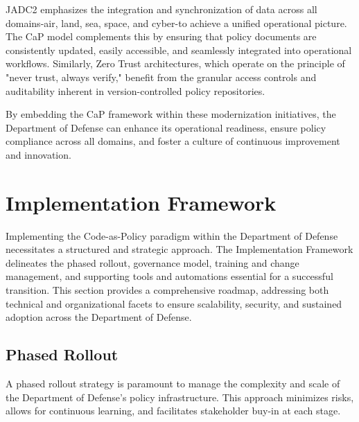 \documentclass[11pt]{article}
\begin{document}
	JADC2 emphasizes the integration and synchronization of data across all domains-air, land, sea, space, and cyber-to achieve a unified operational picture. The CaP model complements this by ensuring that policy documents are consistently updated, easily accessible, and seamlessly integrated into operational workflows. Similarly, Zero Trust architectures, which operate on the principle of "never trust, always verify," benefit from the granular access controls and auditability inherent in version-controlled policy repositories.

	By embedding the CaP framework within these modernization initiatives, the Department of Defense can enhance its operational readiness, ensure policy compliance across all domains, and foster a culture of continuous improvement and innovation.

	\section{Implementation Framework}
\label{sec:implementation-framework}

Implementing the Code-as-Policy paradigm within the Department of Defense necessitates a structured and strategic approach. The Implementation Framework delineates the phased rollout, governance model, training and change management, and supporting tools and automations essential for a successful transition. This section provides a comprehensive roadmap, addressing both technical and organizational facets to ensure scalability, security, and sustained adoption across the Department of Defense.

\subsection{Phased Rollout}

A phased rollout strategy is paramount to manage the complexity and scale of the Department of Defense's policy infrastructure. This approach minimizes risks, allows for continuous learning, and facilitates stakeholder buy-in at each stage.
\end{document}
